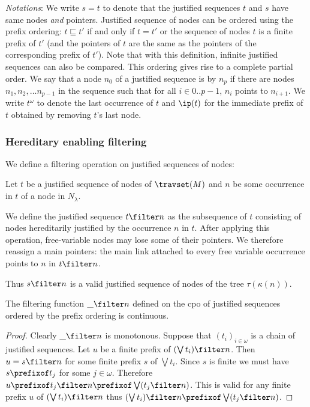 \emph{Notations}: We write $s = t$ to denote that the justified sequences $t$ and $s$
have same nodes \emph{and} pointers. Justified sequence of nodes can
be ordered using the prefix ordering: $t \sqsubseteq t'$ if and only
if $t=t'$ or the sequence of nodes $t$ is a finite prefix of $t'$
(and the pointers of $t$ are the same as the pointers of the
corresponding prefix of $t'$). Note that with this definition,
infinite justified sequences can also be compared. This ordering
gives rise to a complete partial order.
We say that a node $n_0$ of a justified sequence is  by $n_p$ if there are nodes $n_1, n_2, \ldots n_{p-1}$ in the sequence such that for all $i\in 0..p-1$, $n_i$ points to $n_{i+1}$.
We write $t^\omega$ to denote the last occurrence of $t$ and $\ip(t)$ for the immediate prefix of $t$ obtained by removing $t$'s last node.
\smallskip

\subsubsection{Hereditary enabling filtering}

We define a filtering operation on justified sequences of nodes:
\begin{definition}
Let $t$ be a justified sequence of nodes of $\travset(M)$ and 
$n$ be some occurrence in $t$ of a node in $N_\lambda$.

We define the justified sequence $t \filter n$ as the subsequence of $t$ consisting of nodes hereditarily justified by the occurrence $n$ in $t$.
After applying this operation, free-variable nodes may lose some of their pointers. We therefore reassign a main pointers: the main link attached to every free variable occurrence points to $n$ in $t\filter n$.
\end{definition}
Thus $s \filter n$ is a valid justified sequence of nodes of the tree $\tau(\kappa(n))$.

\begin{lemma}
\label{lem:filtercontinous}
The filtering function $\_ \filter n$ defined on the cpo of justified sequences ordered by the prefix ordering is continuous.
\end{lemma}
\begin{proof}
Clearly $\_ \filter n$ is monotonous.
Suppose that $(t_i)_{i\in\omega}$ is a chain of justified sequences. Let $u$ be a finite prefix of $(\bigvee t_i) \filter n$.
Then $u = s \filter n$ for some finite prefix $s$ of $\bigvee t_i$. Since $s$ is finite we must have $s \prefixof t_j$ for some $j\in\omega$.
Therefore $u \prefixof t_j \filter n \prefixof \bigvee (t_j \filter  n)$.
This is valid for any finite prefix $u$ of $(\bigvee t_i) \filter n$ thus $(\bigvee t_i) \filter  n \prefixof \bigvee (t_j \filter n)$.
\end{proof}

